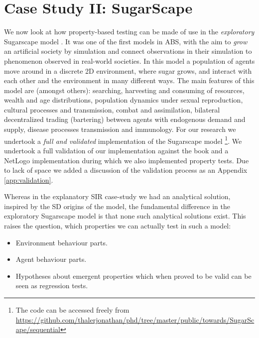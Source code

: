 \section{Case Study II: SugarScape}
\label{sec:case_sug}
We now look at how property-based testing can be made of use in the \textit{exploratory} Sugarscape model \cite{epstein_growing_1996}. It was one of the first models in ABS, with the aim to \textit{grow} an artificial society by simulation and connect observations in their simulation to phenomenon observed in real-world societies. In this model a population of agents move around in a discrete 2D environment, where sugar grows, and interact with each other and the environment in many different ways. The main features of this model are (amongst others): searching, harvesting and consuming of resources, wealth and age distributions, population dynamics under sexual reproduction, cultural processes and transmission, combat and assimilation, bilateral decentralized trading (bartering) between agents with endogenous demand and supply, disease processes transmission and immunology. For our research we undertook a \textit{full and validated} implementation of the Sugarscape model \footnote{The code can be accessed freely from \url{https://github.com/thalerjonathan/phd/tree/master/public/towards/SugarScape/sequential}}. We undertook a full validation of our implementation against the book \cite{epstein_growing_1996} and a NetLogo implementation \cite{weaver_replicating_nodate} during which we also implemented property tests. Due to lack of space we added a discussion of the validation process as an Appendix \ref{app:validation}.

Whereas in the explanatory SIR case-study we had an analytical solution, inspired by the SD origins of the model, the fundamental difference in the exploratory Sugarscape model is that none such analytical solutions exist. This raises the question, which properties we can actually test in such a model: 
\begin{itemize}
	\item Environment behaviour parts.
	\item Agent behaviour parts.
	\item Hypotheses about emergent properties which when proved to be valid can be seen as regression tests.
\end{itemize}

